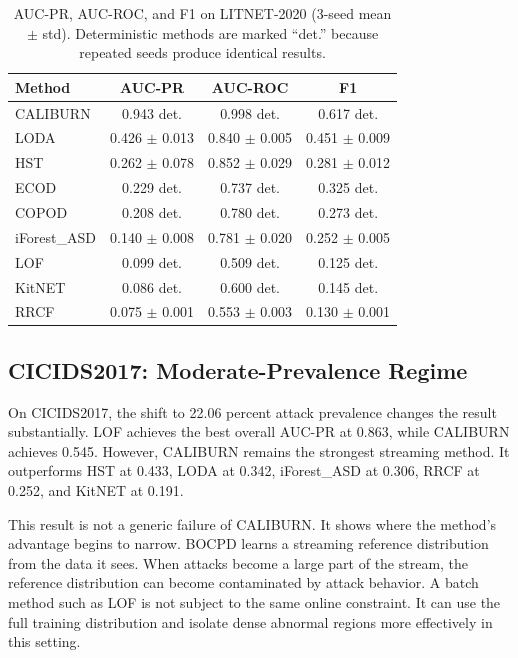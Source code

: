 \documentclass[preprint,12pt,authoryear]{elsarticle}
\newcommand{\caliburn}{CALIBURN}
\begin{document}
\begin{table}[ht]
\centering
\caption{AUC-PR, AUC-ROC, and F1 on LITNET-2020 (3-seed mean $\pm$ std). Deterministic methods are marked ``det.'' because repeated seeds produce identical results.}
\label{tab:litnet-results}
\begin{tabular}{lccc}
\toprule
Method        & AUC-PR              & AUC-ROC             & F1                  \\
\midrule
\caliburn{}   & 0.943 det.          & 0.998 det.          & 0.617 det.          \\
LODA          & 0.426 $\pm$ 0.013   & 0.840 $\pm$ 0.005   & 0.451 $\pm$ 0.009   \\
HST           & 0.262 $\pm$ 0.078   & 0.852 $\pm$ 0.029   & 0.281 $\pm$ 0.012   \\
ECOD          & 0.229 det.          & 0.737 det.          & 0.325 det.          \\
COPOD         & 0.208 det.          & 0.780 det.          & 0.273 det.          \\
iForest\_ASD  & 0.140 $\pm$ 0.008   & 0.781 $\pm$ 0.020   & 0.252 $\pm$ 0.005   \\
LOF           & 0.099 det.          & 0.509 det.          & 0.125 det.          \\
KitNET        & 0.086 det.          & 0.600 det.          & 0.145 det.          \\
RRCF          & 0.075 $\pm$ 0.001   & 0.553 $\pm$ 0.003   & 0.130 $\pm$ 0.001   \\
\bottomrule
\end{tabular}
\end{table}

\subsection{CICIDS2017: Moderate-Prevalence Regime}
\label{sec:results-cicids}

On CICIDS2017, the shift to 22.06 percent attack prevalence changes the result substantially. LOF achieves the best overall AUC-PR at 0.863, while \caliburn{} achieves 0.545. However, \caliburn{} remains the strongest streaming method. It outperforms HST at 0.433, LODA at 0.342, iForest\_ASD at 0.306, RRCF at 0.252, and KitNET at 0.191.

This result is not a generic failure of \caliburn{}. It shows where the method's advantage begins to narrow. BOCPD learns a streaming reference distribution from the data it sees. When attacks become a large part of the stream, the reference distribution can become contaminated by attack behavior. A batch method such as LOF is not subject to the same online constraint. It can use the full training distribution and isolate dense abnormal regions more effectively in this setting.
\end{document}
